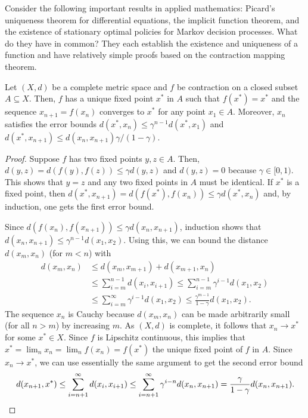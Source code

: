 Consider the following important results in applied mathematics: Picard's uniqueness theorem for differential equations, the implicit function theorem, and the existence of stationary optimal policies for Markov decision processes.
What do they have in common?
They each establish the existence and uniqueness of a function and have relatively simple proofs based on the contraction mapping theorem.

\begin{theorem}
Let $(X,d)$ be a complete metric space and $f$ be contraction on a closed subset $A \subseteq X$.
Then, $f$ has a unique fixed point $x^*$ in $A$ such that $f(x^*) = x^*$ and the sequence $x_{n+1} = f(x_n)$ converges to $x^*$ for any point $x_1 \in A$.  Moreover, $x_n$ satisfies the error bounds $d(x^*,x_n) \leq \gamma^{n-1} d(x^*,x_1)$ and $d(x^*,x_{n+1}) \leq d(x_n,x_{n+1})\gamma /(1-\gamma)$.
\end{theorem}
\begin{proof}
Suppose $f$ has two fixed points $y,z\in A$.
Then, $d(y,z) = d \left(f(y),f(z) \right) \leq \gamma  d(y,z)$ and $d(y,z) = 0$ because $\gamma \in [0,1)$.
This shows that $y=z$ and any two fixed points in $A$ must be identical.
If $x^*$ is a fixed point, then $d(x^*,x_{n+1}) = d(f(x^*),f(x_{n})) \leq \gamma d(x^*,x_n)$ and, by induction, one gets the first error bound.

Since $d(f(x_n),f(x_{n+1})) \leq \gamma d(x_n,x_{n+1})$, induction shows that $d(x_n,x_{n+1}) \leq \gamma^{n-1} d(x_1,x_2)$.
Using this, we can bound the distance $d(x_m,x_n)$ (for $m<n$) with
\begin{align}
d(x_m,x_n)
& \leq d(x_m,x_{m+1}) + d(x_{m+1},x_n) \nonumber \\
& \leq \sum_{i=m}^{n-1} d(x_i,x_{i+1}) 
 \leq \sum_{i=m}^{n-1} \gamma^{i-1} d(x_1,x_2) \nonumber \\
& \leq \sum_{i=m}^\infty \gamma^{i-1} d(x_1,x_2) 
 \leq \frac{\gamma^{m-1}}{1-\gamma} d(x_1,x_2). \label{eq:contraction_error}
\end{align}
The sequence $x_n$ is Cauchy because $d(x_m,x_n)$ can be made arbitrarily small (for all $n>m$) by increasing $m$.
As $(X,d)$ is complete, it follows that $x_n \to x^*$ for some $x^* \in X$.
Since $f$ is Lipschitz continuous, this implies that $x^* = \lim_n x_n = \lim_n f(x_n) = f(x^*)$ the unique fixed point of $f$ in $A$.
Since $x_n \to x^*$, we can use essentially the same argument to get the second error bound
\[  d(x_{n+1},x^*) \leq \sum_{i=n+1}^{\infty} d(x_i,x_{i+1}) 
 \leq \sum_{i=n+1}^{\infty} \gamma^{i-n} d(x_n,x_{n+1}) = \frac{\gamma}{1-\gamma} d(x_n,x_{n+1}).\!  \qedhere \]
\end{proof}

